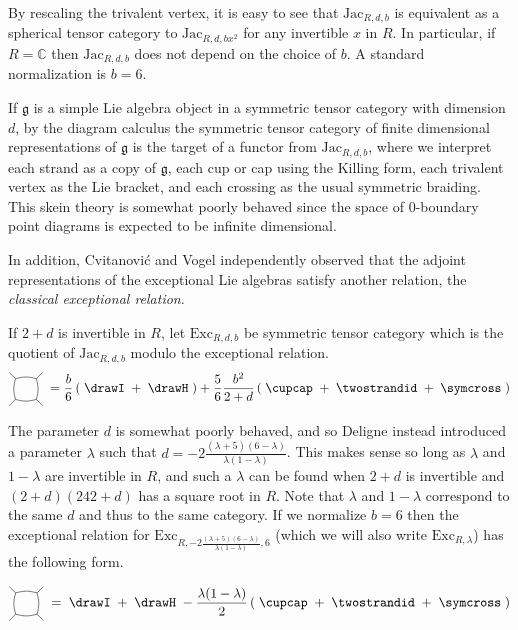 \documentclass[12pt]{amsart}
\begin{document}
By rescaling the trivalent vertex, it is easy to see that $\mathrm{Jac}_{R,d,b}$ is equivalent as a spherical tensor category to $\mathrm{Jac}_{R,d,bx^2}$ for any invertible $x$ in $R$.  In particular, if $R = \mathbb{C}$ then $\mathrm{Jac}_{R,d,b}$ does not depend on the choice of $b$.  A standard normalization is $b=6$.  

If $\mathfrak{g}$ is a simple Lie algebra object in a symmetric tensor
category with dimension $d$, by the diagram calculus  the symmetric tensor
category of finite dimensional representations of $\mathfrak{g}$ is
the target of a
functor from $\mathrm{Jac}_{R,d,b}$, where we interpret each strand as a copy of
$\mathfrak{g}$, each cup or cap using the Killing form, each trivalent vertex
as the Lie bracket, and each crossing as the usual symmetric braiding.  This 
skein theory is somewhat poorly behaved since the space of $0$-boundary point
diagrams is expected to be infinite dimensional.

In addition, Cvitanović and Vogel independently observed that the
adjoint representations
of the exceptional Lie algebras satisfy another relation, the \emph{classical exceptional
relation}.

\begin{definition}
If $2+d$ is invertible in $R$, let $\mathrm{Exc}_{R,d,b}$ be symmetric tensor category which is the quotient of 
$\mathrm{Jac}_{R,d,b}$ modulo the exceptional relation.
\begin{equation}
\ngon[45]{4}\; = \frac{b}{6} \left(\;\drawI\; + \;\drawH\; \right)
 + \frac{5}{6}\frac{b^2}{2+d} \left( \;\cupcap\; + \;\twostrandid\; + \;\symcross\; \right)
\label{eq:classical-except}
\end{equation}
\end{definition}

The parameter $d$ is somewhat poorly behaved, and so Deligne instead
introduced a parameter $\lambda$ such that $d = -2
\frac{(\lambda+5)(6-\lambda)}{\lambda(1-\lambda)}$.  This makes sense so long as $\lambda$ and $1-\lambda$ are invertible in $R$, and such a $\lambda$ can be found when $2+d$ is invertible and $(2+d)(242+d)$ has a square root in $R$.  Note that $\lambda$ and $1-\lambda$ correspond to the same $d$ and thus to the
same category.  If we normalize $b=6$ then the exceptional relation
for $\mathrm{Exc}_{R,-2
  \frac{(\lambda+5)(6-\lambda)}{\lambda(1-\lambda)},6}$ (which we
will also write $\mathrm{Exc}_{R,\lambda}$) has the following form.

\begin{equation}
\ngon[45]{4}\; = \;\drawI\; + \;\drawH\;
 - \frac{\lambda(1-\lambda)}{2} \left( \;\cupcap\; + \;\twostrandid\; + \;\symcross\; \right)
\label{eq:classical-except-2}
\end{equation}
\end{document}
